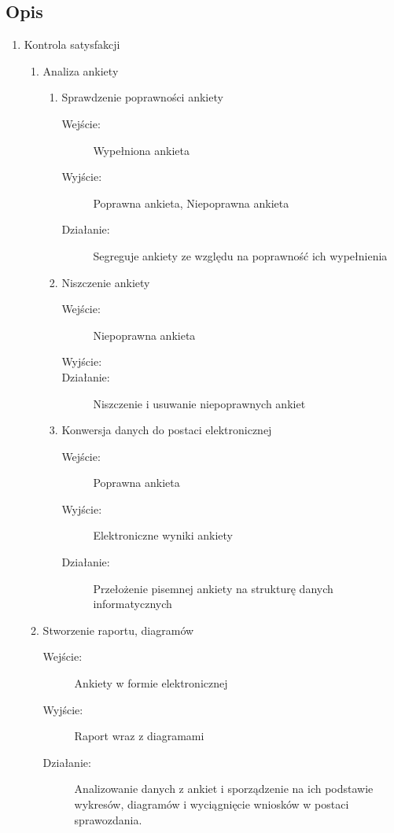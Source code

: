 \documentclass[a4paper, 11pt]{article}
\begin{document}
	
	


	\subsection{Opis}
	\begin{enumerate}[label*=\arabic*.]
		\item Kontrola satysfakcji
		\begin{enumerate}[label*=\arabic*.]
			\item Analiza ankiety
			\begin{enumerate}[label*=\arabic*.]
				\item Sprawdzenie poprawności ankiety
				\begin{description}
					\item[Wejście:]	Wypełniona ankieta 
					\item[Wyjście:]	Poprawna ankieta, Niepoprawna ankieta
					\item[Działanie:]	Segreguje ankiety ze względu na poprawność ich wypełnienia
				\end{description}				
				\item Niszczenie ankiety
				\begin{description}
					\item[Wejście:] Niepoprawna ankieta
					\item[Wyjście:] 
					\item[Działanie:] Niszczenie i usuwanie niepoprawnych ankiet
				\end{description}				
				\item Konwersja danych do postaci elektronicznej
				\begin{description}
					\item[Wejście:] Poprawna ankieta
					\item[Wyjście:] Elektroniczne wyniki ankiety
					\item[Działanie:] Przełożenie pisemnej ankiety na strukturę danych informatycznych
				\end{description}	
			\end{enumerate}
			\item Stworzenie raportu, diagramów
			\begin{description}
				\item[Wejście:] Ankiety w formie elektronicznej
				\item[Wyjście:] Raport wraz z diagramami
				\item[Działanie:] Analizowanie danych z ankiet i sporządzenie na ich podstawie wykresów, diagramów i wyciągnięcie wniosków w postaci sprawozdania.

\end{description}
\end{enumerate}
\end{enumerate}
\end{document}
